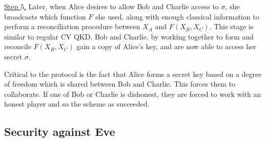 \noindent \underline{Step $5$.} Later, when Alice desires to allow Bob and Charlie access to $\sigma$, she broadcasts which function $F$ she used, along with enough classical information to perform a reconciliation procedure between $X_A$ and $F\left(X_B, X_C\right)$. This stage is similar to regular CV QKD. Bob and Charlie, by working together to form and reconcile $F\left(X_B, X_C\right)$ gain a copy of Alice's key, and are now able to access her secret $\sigma$.

Critical to the protocol is the fact that Alice forms a secret key based on a degree of freedom which is shared between Bob and Charlie. This forces them to collaborate. If one of Bob or Charlie is dishonest, they are forced to work with an honest player and so the scheme as succeeded.





\subsection{Security against Eve}


